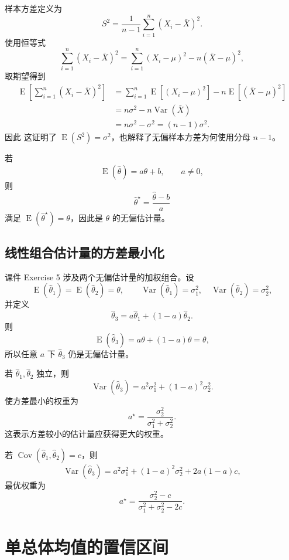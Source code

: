 \documentclass[11pt,a4paper]{article}
\theoremstyle{definition}
\theoremstyle{plain}
\theoremstyle{remark}
\newcommand{\E}{\operatorname{E}}
\newcommand{\Var}{\operatorname{Var}}
\newcommand{\Cov}{\operatorname{Cov}}
\begin{document}
样本方差定义为
\[
    S^2=\frac{1}{n-1}\sum_{i=1}^n(X_i-\bar X)^2.
\]
使用恒等式
\[
    \sum_{i=1}^n(X_i-\bar X)^2
    =
    \sum_{i=1}^n(X_i-\mu)^2-n(\bar X-\mu)^2,
\]
取期望得到
\begin{align}
    \E\left[\sum_{i=1}^n(X_i-\bar X)^2\right]
    &=
    \sum_{i=1}^n\E[(X_i-\mu)^2]
    -n\E[(\bar X-\mu)^2]\\
    &=
    n\sigma^2-n\Var(\bar X)\\
    &=
    n\sigma^2-\sigma^2
    =
    (n-1)\sigma^2.
\end{align}
因此
这证明了 $\E(S^2)=\sigma^2$，也解释了无偏样本方差为何使用分母 $n-1$。

\begin{memorybox}
若
\[
    \E(\hat\theta)=a\theta+b,\qquad a\ne0,
\]
则
\[
    \boxed{
    \hat\theta^\star=\frac{\hat\theta-b}{a}
    }
\]
满足 $\E(\hat\theta^\star)=\theta$，因此是 $\theta$ 的无偏估计量。
\end{memorybox}

\subsection{线性组合估计量的方差最小化}

课件 Exercise 5 涉及两个无偏估计量的加权组合。设
\[
    \E(\hat\theta_1)=\E(\hat\theta_2)=\theta,\qquad
    \Var(\hat\theta_1)=\sigma_1^2,\quad
    \Var(\hat\theta_2)=\sigma_2^2,
\]
并定义
\[
    \hat\theta_3=a\hat\theta_1+(1-a)\hat\theta_2.
\]
则
\[
    \E(\hat\theta_3)=a\theta+(1-a)\theta=\theta,
\]
所以任意 $a$ 下 $\hat\theta_3$ 仍是无偏估计量。

\begin{memorybox}
若 $\hat\theta_1,\hat\theta_2$ 独立，则
\[
    \Var(\hat\theta_3)=a^2\sigma_1^2+(1-a)^2\sigma_2^2.
\]
使方差最小的权重为
\[
    \boxed{a^\star=\frac{\sigma_2^2}{\sigma_1^2+\sigma_2^2}.}
\]
这表示方差较小的估计量应获得更大的权重。
\end{memorybox}

\begin{memorybox}
若 $\Cov(\hat\theta_1,\hat\theta_2)=c$，则
\[
    \Var(\hat\theta_3)
    =
    a^2\sigma_1^2+(1-a)^2\sigma_2^2+2a(1-a)c,
\]
最优权重为
\[
    \boxed{
    a^\star=\frac{\sigma_2^2-c}{\sigma_1^2+\sigma_2^2-2c}.
    }
\]
\end{memorybox}

\section{单总体均值的置信区间}
\label{sec:one-mean-ci}
\end{document}
